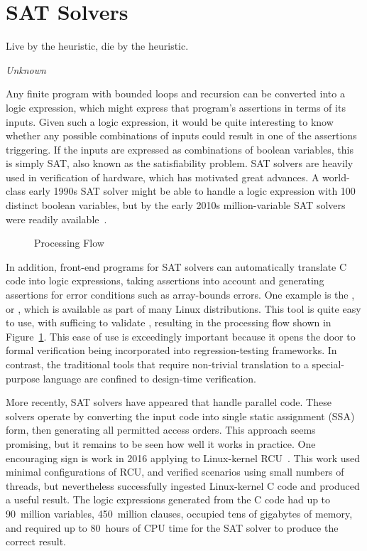
\section{SAT Solvers}
\label{sec:formal:SAT Solvers}
%
\epigraph{Live by the heuristic, die by the heuristic.}{\emph{Unknown}}

Any finite program with bounded loops and recursion can be converted
into a logic expression, which might express that program's assertions
in terms of its inputs.
Given such a logic expression, it would be quite interesting to know
whether any possible combinations of inputs could result in one of
the assertions triggering.
If the inputs are expressed as combinations of boolean variables,
this is simply SAT, also known as the satisfiability problem.
SAT solvers are heavily used in verification of hardware, which has
motivated great advances.
A world-class early 1990s SAT solver might be able to handle a logic
expression with 100 distinct boolean variables, but by the early 2010s
million-variable SAT solvers were readily
available~\cite{Kroening:2008:DPA:1391237}.

\begin{figure}
\centering
{}
\caption{ Processing Flow}
\label{fig:formal:CBMC Processing Flow}
\end{figure}

In addition, front-end programs for SAT solvers can automatically translate
C code into logic expressions, taking assertions into account and generating
assertions for error conditions such as array-bounds errors.
One example is the , or , which is
available as part of many Linux distributions.
This tool is quite easy to use, with  sufficing to
validate , resulting in the processing flow shown in
Figure~\ref{fig:formal:CBMC Processing Flow}.
This ease of use is exceedingly important because it opens the door
to formal verification being incorporated into regression-testing
frameworks.
In contrast, the traditional tools that require non-trivial translation
to a special-purpose language are confined to design-time verification.

More recently, SAT solvers have appeared that handle parallel code.
These solvers operate by converting the input code into single static
assignment (SSA) form, then generating all permitted access orders.
This approach seems promising, but it remains to be seen how well
it works in practice.
One encouraging sign is work in 2016 applying  to Linux-kernel
RCU~\cite{LihaoLiang2016VerifyTreeRCU,Liang:2018:VTB,LanceRoy2017CBMC-SRCU}.
This work used minimal configurations of RCU, and verified scenarios
using small numbers of threads, but nevertheless successfully ingested
Linux-kernel C code and produced a useful result.
The logic expressions generated from the C code had up to 90~million
variables, 450~million clauses, occupied tens of gigabytes of memory,
and required up to 80~hours of CPU time for the SAT solver to produce
the correct result.

